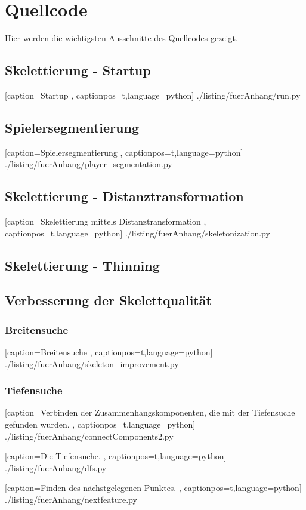 \chapter{Quellcode}
\label{anhang:quellcode}
Hier werden die wichtigsten Ausschnitte des Quellcodes gezeigt. 
\section{Skelettierung - Startup}
 
    [caption={Startup}
       \label{lst:startup},
       captionpos=t,language=python]
 {./listing/fuerAnhang/run.py}
\section{Spielersegmentierung}

    [caption={Spielersegmentierung}
       \label{lst:anhang_spielersegmentierung},
       captionpos=t,language=python]
 {./listing/fuerAnhang/player_segmentation.py}
\section{Skelettierung - Distanztransformation}

    [caption={Skelettierung mittels Distanztransformation}
       \label{lst:anhang_distanztransformation},
       captionpos=t,language=python]
 {./listing/fuerAnhang/skeletonization.py}
\section{Skelettierung - Thinning}
\section{Verbesserung der Skelettqualität}
\subsection{Breitensuche}
 
    [caption={Breitensuche}
       \label{lst:breitensuche},
       captionpos=t,language=python]
 {./listing/fuerAnhang/skeleton_improvement.py}
 \newpage
\subsection{Tiefensuche}

    [caption={Verbinden der Zusammenhangskomponenten, die mit der Tiefensuche gefunden wurden.}
       \label{lst:connectcomponents},
       captionpos=t,language=python]
 {./listing/fuerAnhang/connectComponents2.py}
 
 
     [caption={Die Tiefensuche.}
        \label{lst:tiefensuche},
        captionpos=t,language=python]
  {./listing/fuerAnhang/dfs.py}
  
 
      [caption={Finden des nächstgelegenen Punktes.}
         \label{lst:findnextfeature},
         captionpos=t,language=python]
   {./listing/fuerAnhang/nextfeature.py}